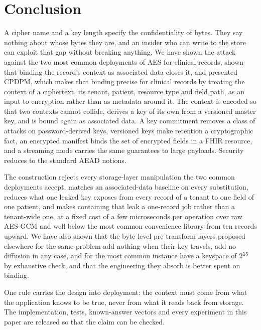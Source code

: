 \section{Conclusion}
\label{sec:conclusion}

A cipher name and a key length specify the confidentiality of bytes. They say nothing about whose bytes they are, and an insider who can write to the store can exploit that gap without breaking anything. We have shown the attack against the two most common deployments of AES for clinical records, shown that binding the record's context as associated data closes it, and presented CPDPM, which makes that binding precise for clinical records by treating the context of a ciphertext, its tenant, patient, resource type and field path, as an input to encryption rather than as metadata around it. The context is encoded so that two contexts cannot collide, derives a key of its own from a versioned master key, and is bound again as associated data. A key commitment removes a class of attacks on password-derived keys, versioned keys make retention a cryptographic fact, an encrypted manifest binds the set of encrypted fields in a FHIR resource, and a streaming mode carries the same guarantees to large payloads. Security reduces to the standard AEAD notions.

The construction rejects every storage-layer manipulation the two common deployments accept, matches an associated-data baseline on every substitution, reduces what one leaked key exposes from every record of a tenant to one field of one patient, and makes containing that leak a one-record job rather than a tenant-wide one, at a fixed cost of a few microseconds per operation over raw AES-GCM and well below the most common convenience library from ten records upward. We have also shown that the byte-level pre-transform layers proposed elsewhere for the same problem add nothing when their key travels, add no diffusion in any case, and for the most common instance have a keyspace of $2^{15}$ by exhaustive check, and that the engineering they absorb is better spent on binding.

One rule carries the design into deployment: the context must come from what the application knows to be true, never from what it reads back from storage. The implementation, tests, known-answer vectors and every experiment in this paper are released so that the claim can be checked.
